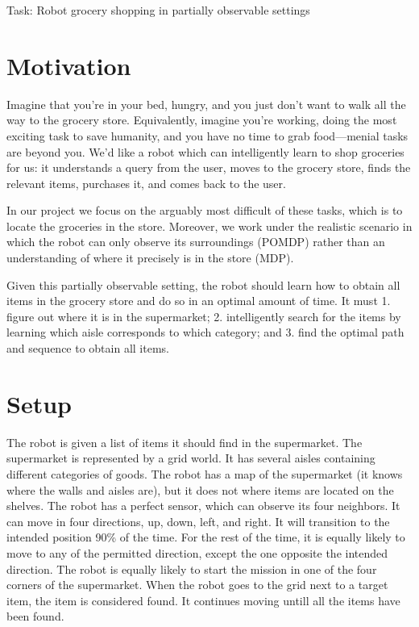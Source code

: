 \documentclass{pset}
\begin{document}

\begin{center}
\Large Task: Robot grocery shopping in partially observable settings
\end{center}
\section{Motivation}
\label{sec:motivation}
Imagine that you're in your bed, hungry, and you just don't want to walk
all the way to the grocery store. Equivalently, imagine you're working, doing the
most exciting task to save humanity, and you have no time to grab food---menial
tasks are beyond you. We'd like a robot which can intelligently learn to shop
groceries for us: it understands a query from the user, moves to the
grocery store, finds the relevant items, purchases it, and comes
back to the user.

In our project we focus on the arguably most difficult of
these tasks, which is to locate the groceries in the store. Moreover, we work
under the realistic
scenario in which the robot can only observe its surroundings (POMDP) rather
than an understanding of where it precisely is in the store (MDP).

Given this partially observable setting, the robot should learn how to obtain
all items in the grocery store and do so in an optimal amount of time. It must
1. figure out where it is in the supermarket;
2. intelligently search for the items by learning which aisle corresponds to
which category; and 3. find the optimal path and sequence to obtain all items.

\section{Setup}
The robot is given a list of items it should find in the supermarket. The supermarket is represented
by a grid world. It has several aisles containing different categories of goods. 
The robot has a map of the supermarket (it knows where the walls and aisles are), but 
it does not where items are located on the shelves. The robot has a perfect sensor, which can
observe its four neighbors. It can move in four directions, up, down, left, and right. It will
transition to the intended position 90\% of the time. For the rest of the time, it is equally likely
to move to any of the permitted direction, except the one opposite the intended direction. The robot
is equally likely to start the mission in one of the four corners of the supermarket. When the robot
goes to the grid next to a target item, the item is considered found. It continues moving untill all
the items have been found. 
\end{document}
